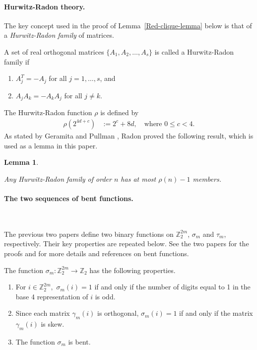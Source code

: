 \documentclass[12pt,a4paper]{article}
\newcommand{\mb}[1]{\mathbb{#1}}
\newcommand{\Z}{\mb{Z}}
\newcommand{\To}{\rightarrow}
\newtheorem{Lemma}{Lemma}
\begin{document}
\paragraph*{Hurwitz-Radon theory.}
\label{sec-Hurwitz-Radon}
The key concept used in the proof of Lemma~\ref{Red-clique-lemma} below is that of a \emph{Hurwitz-Radon family} of matrices.
~

A set of real orthogonal matrices $\{A_1,A_2,\ldots,A_s\}$ is called a Hurwitz-Radon family 
\cite{GerP74a,Hur22,Rad22} if
\begin{enumerate}
 \item
$A_j^T = -A_j$ for all $j=1,\ldots,s$, and
 \item 
$A_j A_k = -A_k A_j$ for all $j \neq k$.
\end{enumerate}
The Hurwitz-Radon function $\rho$ is defined by
\begin{align*}
\rho(2^{4 d + c}) &:= 2^c + 8 d, \quad \text{where~} 0 \leqslant c < 4.
\end{align*}
As stated by Geramita and Pullman \cite{GerP74a}, Radon \cite{Rad22}
proved the following result, which is used as a lemma in this paper.
\begin{Lemma}\label{Hurwitz-Radon-lemma}
\cite[Theorem A]{GerP74a}

Any Hurwitz-Radon family of order $n$ has at most $\rho(n)-1$ members.
\end{Lemma}

\paragraph*{The two sequences of bent functions.}
\label{sec-Bent}

~

The previous two papers \cite{Leo14Constructions,Leo15Twin} 
define two binary functions  on $\Z_2^{2 m}$, $\sigma_m$ and $\tau_m$, respectively.
Their key properties are repeated below.
See the two papers for the proofs and for more details and references on bent functions.

The function $\sigma_m : \Z_2^{2 m} \To \Z_2$ has the following properties.
\begin{enumerate}
 \item 
For $i \in \Z_2^{2m},$ $\sigma_m(i) = 1$ if and only if the number of
digits equal to 1 in  the base 4 representation of $i$ is odd.
 \item 
Since each matrix $\gamma_m(i)$ is orthogonal, $\sigma_m(i) = 1$ if and only if the matrix $\gamma_m(i)$ is skew.
 \item 
The function $\sigma_m$ is bent.
\end{enumerate}
\end{document}
